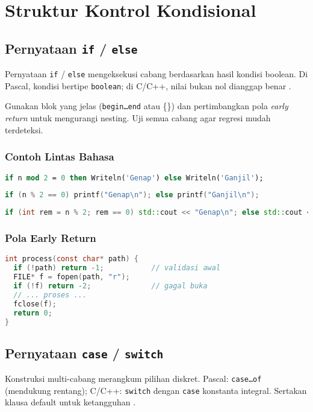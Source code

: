 \documentclass[../main.tex]{subfiles}
\begin{document}
\chapter{Struktur Kontrol Kondisional}
\section{Pernyataan \texttt{if} / \texttt{else}}
Pernyataan \texttt{if} / \texttt{else} mengeksekusi cabang berdasarkan hasil kondisi boolean. Di Pascal, kondisi bertipe \texttt{boolean}; di C/C++, nilai bukan nol dianggap benar \parencite{pascal-tutorial-wikibooks,gnu-c-manual,cpp-reference}.

Gunakan blok yang jelas (\texttt{begin\ldots end} atau \{\}) dan pertimbangkan pola \emph{early return} untuk mengurangi nesting. Uji semua cabang agar regresi mudah terdeteksi.

\subsection{Contoh Lintas Bahasa}
\begin{lstlisting}[language=Pascal, caption={if/else di Pascal}]
if n mod 2 = 0 then Writeln('Genap') else Writeln('Ganjil');
\end{lstlisting}
\begin{lstlisting}[language=C, caption={if/else di C}]
if (n % 2 == 0) printf("Genap\n"); else printf("Ganjil\n");
\end{lstlisting}
\begin{lstlisting}[language=C++, caption={if dengan initializer di C++17}]
if (int rem = n % 2; rem == 0) std::cout << "Genap\n"; else std::cout << "Ganjil\n";
\end{lstlisting}

\subsection{Pola Early Return}
\begin{lstlisting}[language=C]
int process(const char* path) {
  if (!path) return -1;           // validasi awal
  FILE* f = fopen(path, "r");
  if (!f) return -2;              // gagal buka
  // ... proses ...
  fclose(f);
  return 0;
}
\end{lstlisting}

\section{Pernyataan \texttt{case} / \texttt{switch}}
Konstruksi multi-cabang merangkum pilihan diskret. Pascal: \texttt{case\ldots of} (mendukung rentang); C/C++: \texttt{switch} dengan \texttt{case} konstanta integral. Sertakan klausa default untuk ketangguhan \parencite{pascal-tutorial-wikibooks,gnu-c-manual,cpp-reference,cpp-switch,cpp-enum-class}.
\end{document}
